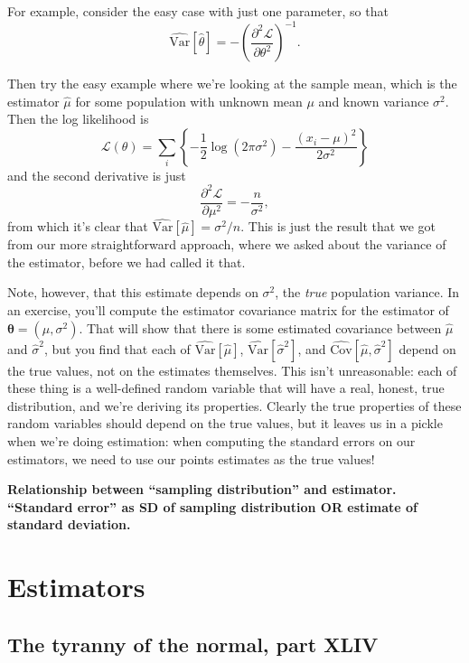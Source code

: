 \documentclass{book}
\begin{document}
For example, consider the easy case with just one parameter, so that \[
\widehat{\mathrm{Var}}[\hat{\theta}] =
  -\left( \frac{\partial^2 \mathcal{L}}{\partial \theta^2} \right)^{-1}.
\]

Then try the easy example where we're looking at the sample mean, which
is the estimator \(\hat{\mu}\) for some population with unknown mean
\(\mu\) and known variance \(\sigma^2\). Then the log likelihood is \[
\mathcal{L}(\theta) = \sum_i \left\{ -\frac{1}{2} \log (2 \pi \sigma^2) -
  \frac{(x_i - \mu)^2}{2 \sigma^2} \right\}
\] and the second derivative is just \[
\frac{\partial^2 \mathcal{L}}{\partial \mu^2} = -\frac{n}{\sigma^2},
\] from which it's clear that
\(\widehat{\mathrm{Var}}[\hat{\mu}] = \sigma^2/n\). This is just the
result that we got from our more straightforward approach, where we
asked about the variance of the estimator, before we had called it that.

Note, however, that this estimate depends on \(\sigma^2\), the
\emph{true} population variance. In an exercise, you'll compute the
estimator covariance matrix for the estimator of
\(\bm{\theta} = (\mu, \sigma^2)\). That will show that there is some
estimated covariance between \(\hat{\mu}\) and \(\hat{\sigma}^2\), but
you find that each of \(\widehat{\mathrm{Var}}[\hat{\mu}]\),
\(\widehat{\mathrm{Var}}[\hat{\sigma}^2]\), and
\(\widehat{\mathrm{Cov}}[\hat{\mu}, \hat{\sigma}^2]\) depend on the true
values, not on the estimates themselves. This isn't unreasonable: each
of these thing is a well-defined random variable that will have a real,
honest, true distribution, and we're deriving its properties. Clearly
the true properties of these random variables should depend on the true
values, but it leaves us in a pickle when we're doing estimation: when
computing the standard errors on our estimators, we need to use our
points estimates as the true values!

\textbf{Relationship between ``sampling distribution'' and estimator.
``Standard error'' as SD of sampling distribution OR estimate of
standard deviation.}



\section{Estimators}\label{estimators}

\subsection{The tyranny of the normal, part
XLIV}\label{the-tyranny-of-the-normal-part-xliv}
\end{document}
